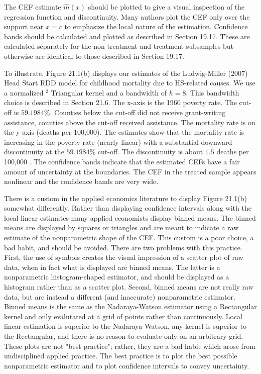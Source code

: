 \documentclass[10pt]{article}
\begin{document}
The CEF estimate $\widehat{m}(x)$ should be plotted to give a visual inspection of the regression function and discontinuity. Many authors plot the CEF only over the support near $x=c$ to emphasize the local nature of the estimation. Confidence bands should be calculated and plotted as described in Section 19.17. These are calculated separately for the non-treatment and treatment subsamples but otherwise are identical to those described in Section 19.17.

To illustrate, Figure 21.1(b) displays our estimates of the Ludwig-Miller (2007) Head Start RDD model for childhood mortality due to HS-related causes. We use a normalized ${ }^{2}$ Triangular kernel and a bandwidth of $h=8$. This bandwidth choice is described in Section 21.6. The x-axis is the 1960 poverty rate. The cut-off is $59.1984 \%$. Counties below the cut-off did not receive grant-writing assistance, counties above the cut-off received assistance. The mortality rate is on the y-axis (deaths per 100,000). The estimates show that the mortality rate is increasing in the poverty rate (nearly linear) with a substantial downward discontinuity at the $59.1984 \%$ cut-off. The discontinuity is about $1.5$ deaths per 100,000 . The confidence bands indicate that the estimated CEFs have a fair amount of uncertainty at the boundaries. The CEF in the treated sample appears nonlinear and the confidence bands are very wide.

There is a custom in the applied economics literature to display Figure 21.1(b) somewhat differently. Rather than displaying confidence intervals along with the local linear estimates many applied economists display binned means. The binned means are displayed by squares or triangles and are meant to indicate a raw estimate of the nonparametric shape of the CEF. This custom is a poor choice, a bad habit, and should be avoided. There are two problems with this practice. First, the use of symbols creates the visual impression of a scatter plot of raw data, when in fact what is displayed are binned means. The latter is a nonparametric histogram-shaped estimator, and should be displayed as a histogram rather than as a scatter plot. Second, binned means are not really raw data, but are instead a different (and inaccurate) nonparametric estimator. Binned means is the same as the Nadaraya-Watson estimator using a Rectangular kernel and only evalutated at a grid of points rather than continuously. Local linear estimation is superior to the Nadaraya-Watson, any kernel is superior to the Rectangular, and there is no reason to evaluate only on an arbitrary grid. These plots are not "best practice"; rather, they are a bad habit which arose from undisciplined applied practice. The best practice is to plot the best possible nonparametric estimator and to plot confidence intervals to convey uncertainty.
\end{document}
